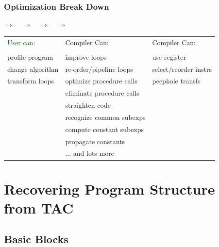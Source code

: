 \documentclass{beamer}
\newcommand{\blue}[1]{\textcolor{Blue}{{#1}}}
\newcommand{\green}[1]{\textcolor{Green}{{#1}}}
\newcommand{\emp}[1]{\textcolor{DikuRed}{ #1}}
\begin{document}
\begin{frame}\frametitle{Optimization Break Down}

\blue{$\Rightarrow$}{\tt~~}\blue{$\Rightarrow$}{\tt~~}\blue{$\Rightarrow$}{\tt~~}\blue{$\Rightarrow$}{\tt~~}

\bigskip
\bigskip

\begin{tabular}{lll}
\green{User can:} & \emp{Compiler Can}: & \emp{Compiler Can}:\\
& & \\
profile program & improve loops & use register\\
change algorithm & re-order/pipeline loops & select/reorder instrs\\
transform loops & optimize procedure calls & peephole transfs\\
 & eliminate procedure calls & \\
 & straighten code & \\
 & recognize common subexps & \\
 & compute constant subexps & \\
 & propagate constants  & \\
 & ... and lots more  & 
\end{tabular}

\end{frame}


\section{Recovering Program Structure from TAC}

\begin{frame}[fragile]
	\tableofcontents[currentsection]
\end{frame}

\subsection{Basic Blocks}
\end{document}
